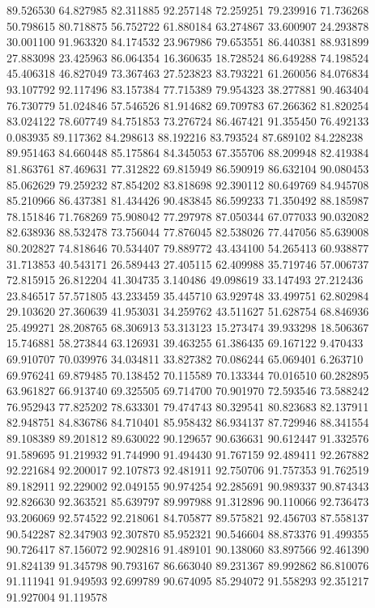 89.526530
64.827985
82.311885
92.257148
72.259251
79.239916
71.736268
50.798615
80.718875
56.752722
61.880184
63.274867
33.600907
24.293878
30.001100
91.963320
84.174532
23.967986
79.653551
86.440381
88.931899
27.883098
23.425963
86.064354
16.360635
18.728524
86.649288
74.198524
45.406318
46.827049
73.367463
27.523823
83.793221
61.260056
84.076834
93.107792
92.117496
83.157384
77.715389
79.954323
38.277881
90.463404
76.730779
51.024846
57.546526
81.914682
69.709783
67.266362
81.820254
83.024122
78.607749
84.751853
73.276724
86.467421
91.355450
76.492133
0.083935
89.117362
84.298613
88.192216
83.793524
87.689102
84.228238
89.951463
84.660448
85.175864
84.345053
67.355706
88.209948
82.419384
81.863761
87.469631
77.312822
69.815949
86.590919
86.632104
90.080453
85.062629
79.259232
87.854202
83.818698
92.390112
80.649769
84.945708
85.210966
86.437381
81.434426
90.483845
86.599233
71.350492
88.185987
78.151846
71.768269
75.908042
77.297978
87.050344
67.077033
90.032082
82.638936
88.532478
73.756044
77.876045
82.538026
77.447056
85.639008
80.202827
74.818646
70.534407
79.889772
43.434100
54.265413
60.938877
31.713853
40.543171
26.589443
27.405115
62.409988
35.719746
57.006737
72.815915
26.812204
41.304735
3.140486
49.098619
33.147493
27.212436
23.846517
57.571805
43.233459
35.445710
63.929748
33.499751
62.802984
29.103620
27.360639
41.953031
34.259762
43.511627
51.628754
68.846936
25.499271
28.208765
68.306913
53.313123
15.273474
39.933298
18.506367
15.746881
58.273844
63.126931
39.463255
61.386435
69.167122
9.470433
69.910707
70.039976
34.034811
33.827382
70.086244
65.069401
6.263710
69.976241
69.879485
70.138452
70.115589
70.133344
70.016510
60.282895
63.961827
66.913740
69.325505
69.714700
70.901970
72.593546
73.588242
76.952943
77.825202
78.633301
79.474743
80.329541
80.823683
82.137911
82.948751
84.836786
84.710401
85.958432
86.934137
87.729946
88.341554
89.108389
89.201812
89.630022
90.129657
90.636631
90.612447
91.332576
91.589695
91.219932
91.744990
91.494430
91.767159
92.489411
92.267882
92.221684
92.200017
92.107873
92.481911
92.750706
91.757353
91.762519
89.182911
92.229002
92.049155
90.974254
92.285691
90.989337
90.874343
92.826630
92.363521
85.639797
89.997988
91.312896
90.110066
92.736473
93.206069
92.574522
92.218061
84.705877
89.575821
92.456703
87.558137
90.542287
82.347903
92.307870
85.952321
90.546604
88.873376
91.499355
90.726417
87.156072
92.902816
91.489101
90.138060
83.897566
92.461390
91.824139
91.345798
90.793167
86.663040
89.231367
89.992862
86.810076
91.111941
91.949593
92.699789
90.674095
85.294072
91.558293
92.351217
91.927004
91.119578

